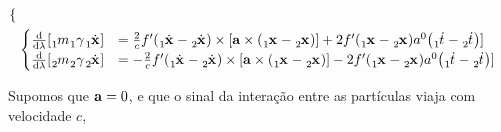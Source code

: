 \documentclass[twoside]{amsart}
\numberwithin{equation}{section}
\begin{document}
\begin{align}
\begin{cases}
    \end{cases}\\
    &\begin{cases}
        \dv{}{\lambda}\qty[\tensor[_1]{m}{}\tensor[_1]{\gamma}{}\tensor[_1]{\dot{\vb{x}}}{}]&=\frac{2}{c}{f'}\qty(\tensor[_1]{\dot{\vb{x}}}{}-\tensor[_2]{\dot{\vb{x}}}{})\times\qty[\vb a\times\qty(\tensor[_1]{\vb{x}}{}-\tensor[_2]{\vb{x}}{})]+2{f'}\qty(\tensor[_1]{\vb{x}}{}-\tensor[_2]{\vb{x}}{})a^0\qty(\tensor[_1]{\dot{t}}{}-\tensor[_2]{\dot{t}}{})]\\
        \dv{}{\lambda}\qty[\tensor[_2]{m}{}\tensor[_2]{\gamma}{}\tensor[_2]{\dot{\vb{x}}}{}]&=-\frac{2}{c}{f'}\qty(\tensor[_1]{\dot{\vb{x}}}{}-\tensor[_2]{\dot{\vb{x}}}{})\times\qty[\vb a\times\qty(\tensor[_1]{\vb{x}}{}-\tensor[_2]{\vb{x}}{})]-2{f'}\qty(\tensor[_1]{\vb{x}}{}-\tensor[_2]{\vb{x}}{})a^0\qty(\tensor[_1]{\dot{t}}{}-\tensor[_2]{\dot{t}}{})]
    \end{cases}\\
\end{align}

Supomos que $\vb a =0$, e que o sinal da interação entre as partículas viaja com velocidade $c$,
\end{document}
